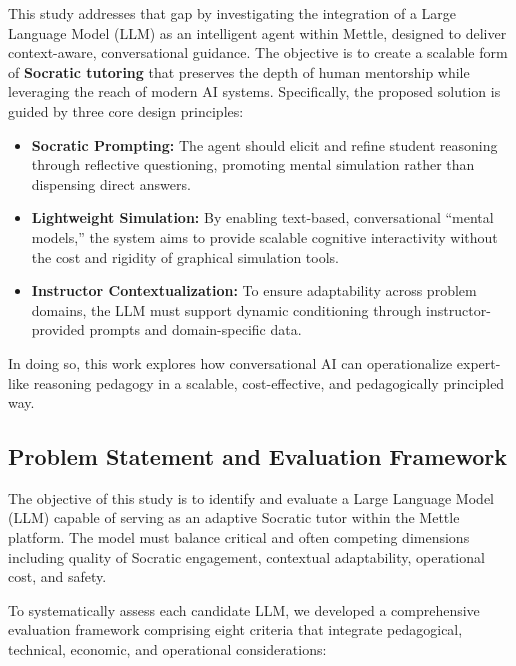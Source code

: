 This study addresses that gap by investigating the integration of a Large Language Model (LLM) as an intelligent agent within Mettle, designed to deliver context-aware, conversational guidance. The objective is to create a scalable form of \textbf{Socratic tutoring} that preserves the depth of human mentorship while leveraging the reach of modern AI systems. Specifically, the proposed solution is guided by three core design principles:
\begin{itemize}[leftmargin=*]
    \item \textbf{Socratic Prompting:} The agent should elicit and refine student reasoning through reflective questioning, promoting mental simulation rather than dispensing direct answers.
    \item \textbf{Lightweight Simulation:} By enabling text-based, conversational “mental models,” the system aims to provide scalable cognitive interactivity without the cost and rigidity of graphical simulation tools.
    \item \textbf{Instructor Contextualization:} To ensure adaptability across problem domains, the LLM must support dynamic conditioning through instructor-provided prompts and domain-specific data.
\end{itemize}

In doing so, this work explores how conversational AI can operationalize expert-like reasoning pedagogy in a scalable, cost-effective, and pedagogically principled way.

\subsection{Problem Statement and Evaluation Framework}
\label{subsection:Problem_Statement}
The objective of this study is to identify and evaluate a Large Language Model (LLM) capable of serving as an adaptive Socratic tutor within the Mettle platform. The model must balance critical and often competing dimensions including quality of Socratic engagement, contextual adaptability, operational cost, and safety.

To systematically assess each candidate LLM, we developed a comprehensive evaluation framework comprising eight criteria that integrate pedagogical, technical, economic, and operational considerations:

